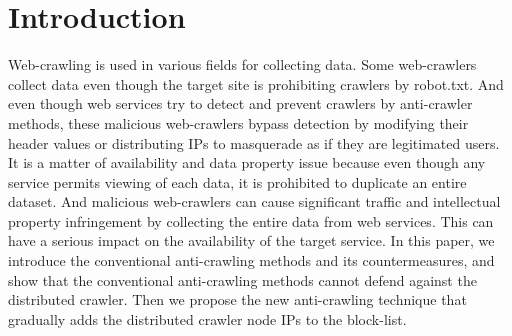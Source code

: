 \documentclass[sigconf,anonymous=false]{acmart}
\begin{document}
\maketitle


%
%
\section{Introduction}
Web-crawling is used in various fields for collecting data. Some web-crawlers collect data even though the target site is prohibiting crawlers by robot.txt. And even though web services try to detect and prevent crawlers by anti-crawler methods, these malicious web-crawlers bypass detection by modifying their header values or distributing IPs to masquerade as if they are legitimated users.
It is a matter of availability and data property issue because even though any service permits viewing of each data, it is prohibited to duplicate an entire dataset. And malicious web-crawlers can cause significant traffic and intellectual property infringement by collecting the entire data from web services. This can have a serious impact on the availability of the target service.
In this paper, we introduce the conventional anti-crawling methods and its countermeasures, and show that the conventional anti-crawling methods cannot defend against the distributed crawler. Then we propose the new anti-crawling technique that gradually adds the distributed crawler node IPs to the block-list.

%
%
\end{document}
